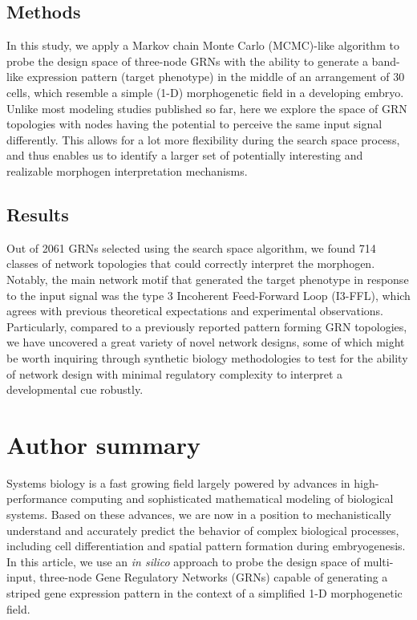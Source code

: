 \documentclass[10pt,letterpaper]{article}
\begin{document}
\subsection*{Methods}
In this study, we apply a Markov chain Monte Carlo (MCMC)-like algorithm to probe
the design space of three-node GRNs with the ability to generate a band-like
expression pattern (target phenotype) in the middle of an arrangement of 30
cells, which resemble a simple (1-D) morphogenetic field in a developing embryo.
Unlike most modeling studies published so far, here we explore the
space of GRN topologies with nodes having the potential to perceive
the same input signal differently. This allows for a lot more flexibility during the search
space process, and thus enables us to identify a larger set of potentially
interesting and realizable morphogen interpretation mechanisms.

\subsection*{Results}
Out of 2061 GRNs selected using the search space algorithm, we found 714 classes of
network topologies that could correctly interpret the morphogen.
Notably, the main network motif that generated the target phenotype in
response to the input signal was the type 3 Incoherent Feed-Forward Loop (I3-FFL),
which agrees with previous theoretical expectations and experimental
observations. Particularly, compared to a previously reported pattern forming GRN
topologies, we have uncovered a great variety of novel network designs, some of
which might be worth inquiring through synthetic biology methodologies to test
for the ability of network design with minimal regulatory complexity to
interpret a developmental cue robustly.



\section*{Author summary}
Systems biology is a fast growing field largely powered by advances in
high-performance computing and sophisticated mathematical modeling of
biological systems. Based on these advances, we are now in a position to
mechanistically understand and accurately predict the behavior of
complex biological processes, including cell differentiation and spatial pattern
formation during embryogenesis. In this article, we use an \textit{in silico}
approach to probe the design space of multi-input, three-node Gene Regulatory
Networks (GRNs) capable of generating a striped gene expression pattern in
the context of a simplified 1-D morphogenetic field.
\end{document}

